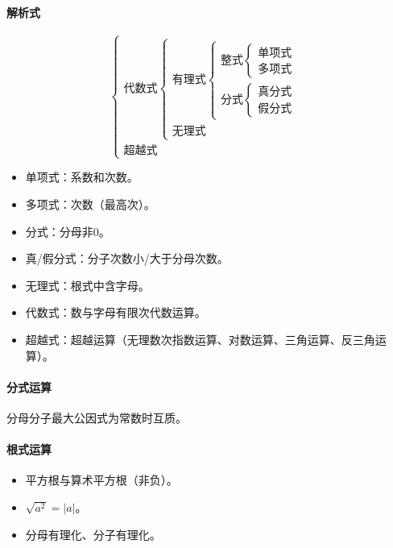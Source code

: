 \documentclass[
12pt, %
a4paper, 
oneside, %
headinclude,footinclude, %
]{scrartcl}
\begin{document}
\paragraph{解析式}
$$
\begin{cases} 
\text{代数式} \begin{cases} 
\text{有理式} \begin{cases} 
\text{整式} \begin{cases} 
\text{单项式} \\ \text{多项式} \end{cases} \\ 
\text{分式} \begin{cases} 
\text{真分式} \\ \text{假分式} \end{cases} \end{cases} \\ 
\text{无理式} \end{cases} \\ 
\text{超越式} \end{cases}
$$
\begin{itemize}
\item 单项式：系数和次数。
\item 多项式：次数（最高次）。
\item 分式：分母非$ 0 $。
\item 真/假分式：分子次数小/大于分母次数。
\item 无理式：根式中含字母。
\item 代数式：数与字母有限次代数运算。
\item 超越式：超越运算（无理数次指数运算、对数运算、三角运算、反三角运算）。
\end{itemize}
\paragraph{分式运算}
分母分子最大公因式为常数时互质。
\paragraph{根式运算}
\begin{itemize}
\item 平方根与算术平方根（非负）。
\item $ \sqrt{a^2} = |a| $。
\item 分母有理化、分子有理化。
\end{itemize}
\end{document}
